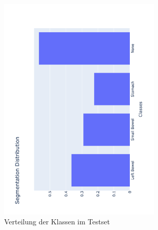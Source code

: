 \begin{figure}[htb]
	\begin{center}
		\includegraphics[width=220pt , angle=270]{bilder/segmentation_distribution}
		\caption{Verteilung der Klassen im Testset}\label{Fig:klassenverteilung}
	\end{center}
\end{figure}

\pagebreak